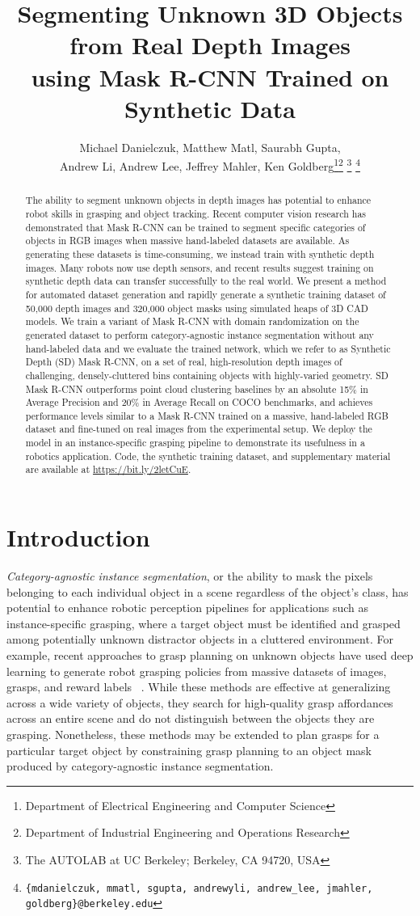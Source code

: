 \documentclass[letterpaper, 10 pt, conference]{ieeeconf}  \pdfoutput=1
\title{Segmenting Unknown 3D Objects from Real Depth Images\\ using Mask R-CNN Trained on Synthetic Data}
\author{Michael Danielczuk, Matthew Matl, Saurabh Gupta,\\ Andrew Li, Andrew Lee, Jeffrey Mahler, Ken Goldberg\thanks{Department of Electrical Engineering and Computer Science}\thanks{Department of Industrial Engineering and Operations Research}
\thanks{The AUTOLAB at UC Berkeley; Berkeley, CA 94720, USA}
\thanks{{\tt\small \{mdanielczuk, mmatl, sgupta, andrewyli, andrew\_lee, jmahler, goldberg\}@berkeley.edu}}}
\numberwithin{equation}{section}
\begin{document}
\maketitle

\begin{abstract}
The ability to segment unknown objects in depth images has potential to enhance robot skills in grasping and object tracking.
Recent computer vision research has demonstrated that Mask R-CNN can be trained to segment specific categories of objects in RGB images when massive hand-labeled datasets are available.
As generating these datasets is time-consuming, we instead train with synthetic depth images. Many robots now use depth sensors, and recent results suggest training on synthetic depth data can transfer successfully to the real world. 
We present a method for automated dataset generation and rapidly generate a synthetic training dataset of 50,000 depth images and 320,000 object masks using simulated heaps of 3D CAD models.
We train a variant of Mask R-CNN with domain randomization on the generated dataset to perform category-agnostic instance segmentation without any hand-labeled data and we evaluate the trained network, which we refer to as Synthetic Depth (SD) Mask R-CNN, on a set of real, high-resolution depth images of challenging, densely-cluttered bins containing objects with highly-varied geometry. SD Mask R-CNN outperforms point cloud clustering baselines by an absolute 15\% in Average Precision and 20\% in Average Recall on COCO benchmarks, and achieves performance levels similar to a Mask R-CNN trained on a massive, hand-labeled RGB dataset and fine-tuned on real images from the experimental setup. We deploy the model in an instance-specific grasping pipeline to demonstrate its usefulness in a robotics application.
Code, the synthetic training dataset, and supplementary material are available at \url{https://bit.ly/2letCuE}.
\end{abstract}
 \section{Introduction}
\textit{Category-agnostic instance segmentation}, or the ability to mask the pixels belonging to each individual object in a scene regardless of the object's class, has potential to enhance robotic perception pipelines for applications such as instance-specific grasping, where a target object must be identified and grasped among potentially unknown distractor objects in a cluttered environment.
For example, recent approaches to grasp planning on unknown objects have used deep learning to generate robot grasping policies from massive datasets of images, grasps, and reward labels ~\cite{mahlerdexnet2, ten2018using}.
While these methods are effective at generalizing across a wide variety of objects, they search for high-quality grasp affordances across an entire scene and do not distinguish between the objects they are grasping.
Nonetheless, these methods may be extended to plan grasps for a particular target object by constraining grasp planning to an object mask produced by category-agnostic instance segmentation.
\end{document}
